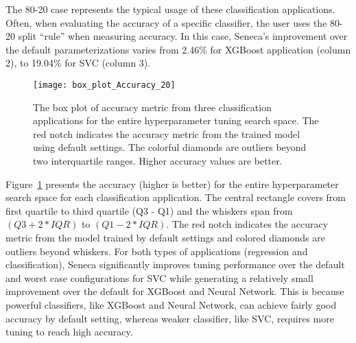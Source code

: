 \begin{table}
\centering

\caption{The Accuracy reported for the 
default, best (Seneca's recommendation), and worst hyperparameter configurations for 
the three classification applications using 80\% of the data to train and 20\%
of the data as a test set. 
For the accuracy values in the table, higher is better.
\label{tab:accuracy}}
\vspace{-0.2in}
\end{table}


The 80-20 case represents the typical usage of these classification
applications. Often, when evaluating the accuracy of a specific classifier,
the user uses the 80-20 split ``rule'' when measuring accuracy. In this case,
Seneca's improvement over the default parameterizations varies from 2.46\% for XGBoost application (column 2), to 19.04\% for SVC
(column 3).

\begin{figure}[t] \centering 
\texttt{[image: box\_plot\_Accuracy\_20]}
\vspace{-0.4in}
\caption{The box plot of accuracy metric from three classification applications for the entire hyperparameter tuning search space. The red notch indicates the accuracy metric from the trained model using default settings. The colorful diamonds are outliers beyond two interquartile ranges. Higher accuracy values are better.
\label{fig:box_plot_accuracy}}
\vspace{-0.1in}
\end{figure}

Figure~\ref{fig:box_plot_accuracy} presents the accuracy (higher is better) 
for the entire hyperparameter search space for each classification
application.  The central rectangle covers from first quartile to third quartile (Q3 - Q1) and the whiskers span from \texttt{$(Q3 + 2 * IQR)$} to \texttt{$(Q1 - 2 * IQR)$}. The red notch indicates the accuracy metric from the model trained by default settings and colored diamonds are outliers beyond whiskers.
For both types of applications (regression and classification), Seneca significantly
improves tuning performance over the default and worst case configurations for SVC while generating a relatively small improvement over the default for XGBoost and Neural Network. This is because powerful classifiers, like XGBoost and Neural Network, can achieve fairly good accuracy by default setting, whereas weaker classifier, like SVC, requires more tuning to reach high accuracy.

